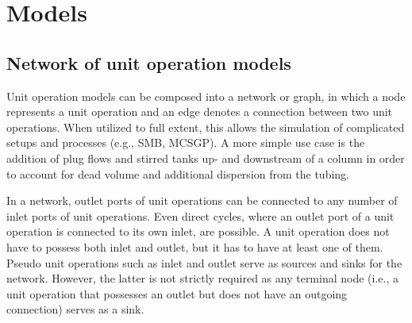%  
%  

\chapter{Models}

%

\section{Network of unit operation models}\label{sec:MUOPNetwork}

Unit operation models can be composed into a network  or graph, in which a node represents a unit operation and an edge denotes a connection between two unit operations.
When utilized to full extent, this allows the simulation of complicated setups and processes (e.g., SMB, MCSGP).
A more simple use case is the addition of plug flows and stirred tanks up- and downstream of a column in order to account for dead volume and additional dispersion from the tubing.

In a network, outlet ports of unit operations can be connected to any number of inlet ports of unit operations.
Even direct cycles, where an outlet port of a unit operation is connected to its own inlet, are possible.
A unit operation does not have to possess both inlet and outlet, but it has to have at least one of them.
Pseudo unit operations such as inlet and outlet serve as sources and sinks for the network.
However, the latter is not strictly required as any terminal node (i.e., a unit operation that possesses an outlet but does not have an outgoing connection) serves as a sink.

